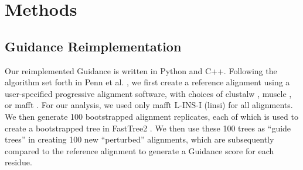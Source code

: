 \documentclass[10pt]{article}
\begin{document}
\section*{Methods}

\subsection*{Guidance Reimplementation}
Our reimplemented Guidance is written in Python and C++. Following the algorithm set forth in Penn et al. \citep{Penn2010}, we first create a reference alignment using a user-specified progressive alignment software, with choices of clustalw \citep{Thompson1994}, muscle \citep{Edgar2004}, or mafft \citep{Katoh2002, Katoh2005}. For our analysis, we used only mafft L-INS-I (linsi) for all alignments. We then generate 100 bootstrapped alignment replicates, each of which is used to create a bootstrapped tree in FastTree2 \citep{Price2010}. We then use these 100 trees as “guide trees” in creating 100 new “perturbed” alignments, which are subsequently compared to the reference alignment to generate a Guidance score for each residue.
\end{document}
